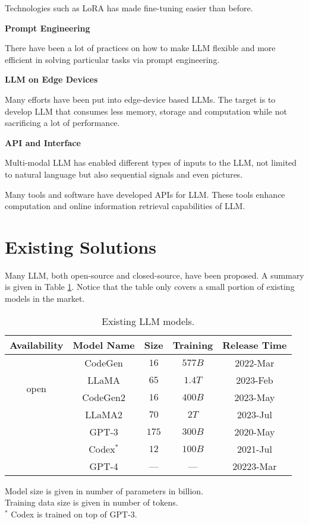Technologies such as LoRA has made fine-tuning easier than before.

\vspace{0.1in}
\noindent \textbf{Prompt Engineering}
\vspace{0.1in}

There have been a lot of practices on how to make LLM flexible and more efficient in solving particular tasks via prompt engineering.

\vspace{0.1in}
\noindent \textbf{LLM on Edge Devices}
\vspace{0.1in}

Many efforts have been put into edge-device based LLMs. The target is to develop LLM that consumes less memory, storage and computation while not sacrificing a lot of performance.

\vspace{0.1in}
\noindent \textbf{API and Interface}
\vspace{0.1in}

Multi-modal LLM has enabled different types of inputs to the LLM, not limited to natural language but also sequential signals and even pictures.

Many tools and software have developed APIs for LLM. These tools enhance computation and online information retrieval capabilities of LLM.

\section{Existing Solutions}

Many LLM, both open-source and closed-source, have been proposed. A summary is given in Table \ref{ch:llm:tab:existingmodel}. Notice that the table only covers a small portion of existing models in the market.

\begin{table}
	\centering \caption{Existing LLM models.}\label{ch:llm:tab:existingmodel}
	\begin{tabular}{ccccc}
		\hline
		Availability & Model Name & Size & Training & Release Time \\ \hline
		\multirow{4}{*}{open} & CodeGen & $16$ & $577B$ & 2022-Mar \\
		 & LLaMA & $65$ & $1.4T$ & 2023-Feb \\
		 & CodeGen2 & $16$ & $400B$ & 2023-May \\
		 & LLaMA2 & $70$ & $2T$ & 2023-Jul \\ \hdashline
		\multirow{3}{*}{closed} & GPT-3 & $175$ & $300B$ & 2020-May \\
		 & Codex$^*$ & $12$ & $100B$ & 2021-Jul \\ 
		 & GPT-4 & --- & --- & 20223-Mar \\ 
		\hline
	\end{tabular}
\begin{flushleft}
	\footnotesize 
	Model size is given in number of parameters in billion. \\
	Training data size is given in number of tokens. \\
	$^*$ Codex is trained on top of GPT-3.
\end{flushleft}
\end{table}

